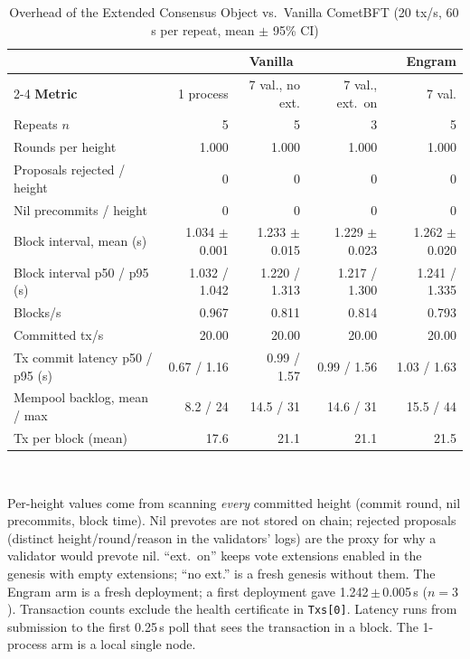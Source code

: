\begin{table}[h]
\caption{Overhead of the Extended Consensus Object vs.\ Vanilla CometBFT
(20 tx/s, 60\,s per repeat, mean $\pm$ 95\% CI)}
\label{tab:overhead}
\centering
\footnotesize
\begin{tabular}{@{}lrrrr@{}}
\toprule
 & \multicolumn{3}{c}{\textbf{Vanilla}} & \textbf{Engram} \\
\cmidrule(lr){2-4}
\textbf{Metric} & 1 process & 7 val., no ext. & 7 val., ext.\ on & 7 val. \\
\midrule
Repeats $n$ & 5 & 5 & 3 & 5 \\
Rounds per height & 1.000 & 1.000 & 1.000 & 1.000 \\
Proposals rejected / height & 0 & 0 & 0 & 0 \\
Nil precommits / height & 0 & 0 & 0 & 0 \\
Block interval, mean (s) & 1.034 $\pm$ 0.001 & 1.233 $\pm$ 0.015 & 1.229 $\pm$ 0.023 & 1.262 $\pm$ 0.020 \\
Block interval p50 / p95 (s) & 1.032 / 1.042 & 1.220 / 1.313 & 1.217 / 1.300 & 1.241 / 1.335 \\
Blocks/s & 0.967 & 0.811 & 0.814 & 0.793 \\
Committed tx/s & 20.00 & 20.00 & 20.00 & 20.00 \\
Tx commit latency p50 / p95 (s) & 0.67 / 1.16 & 0.99 / 1.57 & 0.99 / 1.56 & 1.03 / 1.63 \\
Mempool backlog, mean / max & 8.2 / 24 & 14.5 / 31 & 14.6 / 31 & 15.5 / 44 \\
Tx per block (mean) & 17.6 & 21.1 & 21.1 & 21.5 \\
\bottomrule
\end{tabular}
\\[2pt]
\begin{minipage}{\linewidth}
\raggedright
\footnotesize Per-height values come from scanning \emph{every} committed
height (commit round, nil precommits, block time). Nil prevotes are not stored
on chain; rejected proposals (distinct height/round/reason in the validators'
logs) are the proxy for why a validator would prevote nil. ``ext.\ on'' keeps
vote extensions enabled in the genesis with empty extensions; ``no ext.'' is a
fresh genesis without them. The Engram arm is a fresh deployment; a first
deployment gave 1.242\,$\pm$\,0.005\,s ($n{=}3$). Transaction counts exclude
the health certificate in \texttt{Txs[0]}. Latency runs from submission to the
first 0.25\,s poll that sees the transaction in a block. The 1-process arm is a
local single node.
\end{minipage}
\end{table}

